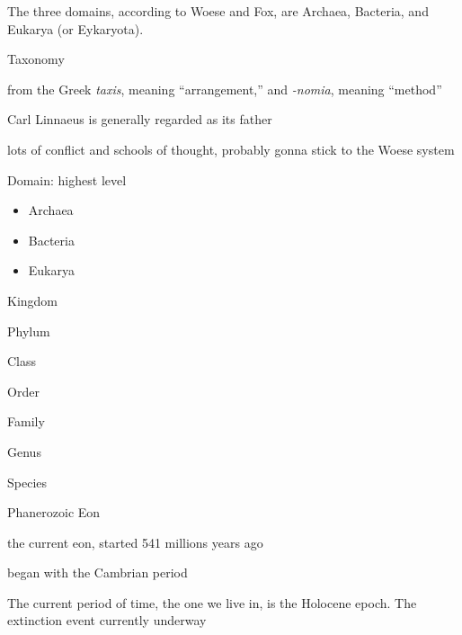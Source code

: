 \documentclass[./butidigress.tex]{subfiles}
\begin{document}
The three domains, according to Woese and Fox, are Archaea, Bacteria, and Eukarya (or Eykaryota).



\begin{somenotes}{Taxonomy}
    \item from the Greek \emph{taxis}, meaning \enquote{arrangement,} and \emph{-nomia}, meaning \enquote{method}
    \item Carl Linnaeus is generally regarded as its father
    \item lots of conflict and schools of thought, probably gonna stick to the Woese system\autocite{woeseorignial}
    \item Domain: highest level
    \begin{itemize}
        \item Archaea
        \item Bacteria
        \item Eukarya
    \end{itemize}
    \item Kingdom
    \item Phylum
    \item Class
    \item Order
    \item Family
    \item Genus
    \item Species
\end{somenotes}


\begin{somenotes}{Phanerozoic Eon}
    \item the current eon, started \num{541} millions years ago
    \item began with the Cambrian period
\end{somenotes}




The current period of time, the one we live in, is the Holocene epoch.
The extinction event currently underway\lips
\end{document}
